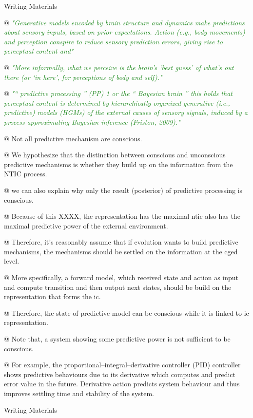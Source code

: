 \documentclass[utf8]{article}
\newenvironment{writingMaterials}
			{	
			\begin{tcolorbox}[size=small, colframe=black!20!white, toprule=1mm]
				Writing Materials
			\end{tcolorbox}
			
			\begin{easylist}[itemize]		
			}
			{
			\end{easylist}
			\begin{tcolorbox}[size=small, bottomrule=1mm, halign=flush right, colframe=black!20!white]
				Writing Materials
			\end{tcolorbox}			
			}
\newcommand{\rewrite}[1]{\textcolor{ForestGreen}{\textit{"#1"}}\newline}
\begin{document}
\begin{writingMaterials}
				@ \rewrite{Generative models encoded by brain structure and dynamics make predictions about sensory inputs, based on prior expectations. Action (e.g., body movements) and perception conspire to reduce sensory prediction errors, giving rise to perceptual content and} 
				
				@ \rewrite{More informally, what we perceive is the brain’s ‘best guess’ of what’s out there (or ‘in here’, for perceptions of body and self).}
				
				@ \rewrite{“ predictive processing ” (PP) 1 or the “ Bayesian brain ” this holds that perceptual content is determined by hierarchically organized generative (i.e., predictive) models (HGMs) of the external causes of sensory signals, induced by a process approximating Bayesian inference (Friston, 2009).}
				
				
				
				@ Not all predictive mechanism are conscious.
				
				
				@ We hypothesize that the distinction between conscious and unconscious predictive mechanisms is whether they build up on the information from the NTIC process. 
				

				
				
				@ we can also explain why only the result (posterior) of predictive processing is conscious. 

			
				@ Because of this XXXX, the representation has the maximal \ac{ntic} also has the maximal predictive power of the external environment. 
				
				
				@ Therefore, it's reasonably assume that if evolution wants to build predictive mechanisms, the mechanisms should be settled on the information at the \ac{cged} level.
				
				@ More specifically, a forward model, which received state and action as input and compute transition and then output next states, should be build on the representation that forms the \acl{ic}. 
				
				@ Therefore, the state of predictive model can be conscious while it is linked to \acl{ic} representation. 
				
				@ Note that, a system showing some predictive power is not sufficient to be conscious. 
				
				@ For example, the proportional–integral–derivative controller (PID) controller shows predictive behaviours due to its derivative which computes and predict error value in the future. Derivative action predicts system behaviour and thus improves settling time and stability of the system. 
				

\end{writingMaterials}
\end{document}

